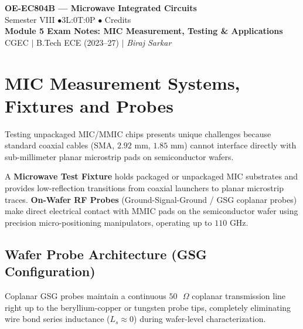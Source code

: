 \documentclass[10pt,a4paper]{article}
\begin{document}
\begin{center}
  {\LARGE\bfseries\color{myred} OE-EC804B --- Microwave Integrated Circuits}\\[5pt]
  {\normalsize\color{mydark} Semester VIII \quad$\bullet$\quad 3L:0T:0P \quad$\bullet$ Credits}\\[3pt]
  {\normalsize\color{myteal}\textbf{Module 5 Exam Notes: MIC Measurement, Testing \& Applications}}\\[3pt]
  {\small\color{mydark} CGEC \;$|$\; B.Tech ECE (2023--27) \;$|$\; \textit{Biraj Sarkar}}
\end{center}
\vspace{2pt}
\noindent{\color{myred}\rule{\linewidth}{1.5pt}}
\vspace{2pt}

\hypersetup{linkcolor=mydark}
\tableofcontents
\hypersetup{linkcolor=myteal}
\newpage

\section{MIC Measurement Systems, Fixtures and Probes}

Testing unpackaged MIC/MMIC chips presents unique challenges because standard coaxial cables (SMA, $2.92\text{ mm}$, $1.85\text{ mm}$) cannot interface directly with sub-millimeter planar microstrip pads on semiconductor wafers.

\begin{tcolorbox}[defbox, title={Microwave Test Fixture \& On-Wafer Probes}]
  A \textbf{Microwave Test Fixture} holds packaged or unpackaged MIC substrates and provides low-reflection transitions from coaxial launchers to planar microstrip traces. \textbf{On-Wafer RF Probes} (Ground-Signal-Ground / GSG coplanar probes) make direct electrical contact with MMIC pads on the semiconductor wafer using precision micro-positioning manipulators, operating up to $110\text{ GHz}$.
\end{tcolorbox}

\subsection{Wafer Probe Architecture (GSG Configuration)}
Coplanar GSG probes maintain a continuous $50\text{ }\Omega$ coplanar transmission line right up to the beryllium-copper or tungsten probe tips, completely eliminating wire bond series inductance ($L_s \approx 0$) during wafer-level characterization.
\end{document}

